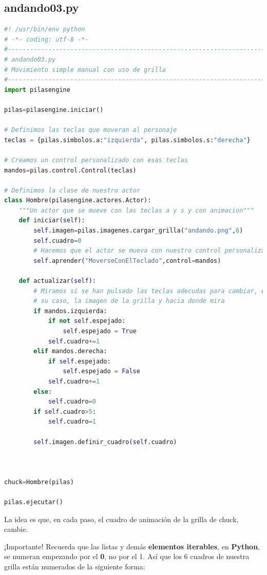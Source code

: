 \documentclass{article}
\begin{document}
\subsection{andando03.py}
\begin{lstlisting}[language=Python]
#! /usr/bin/env python
# -*- coding: utf-8 -*-
#-----------------------------------------------------------------------
# andando03.py
# Movimiento simple manual con uso de grilla
#-----------------------------------------------------------------------
import pilasengine

pilas=pilasengine.iniciar()

# Definimos las teclas que moveran al personaje
teclas = {pilas.simbolos.a:"izquierda", pilas.simbolos.s:"derecha"}

# Creamos un control personalizado con esas teclas
mandos=pilas.control.Control(teclas)

# Definimos la clase de nuestro actor
class Hombre(pilasengine.actores.Actor):
    """Un actor que se mueve con las teclas a y s y con animacion"""
    def iniciar(self):
        self.imagen=pilas.imagenes.cargar_grilla("andando.png",6)
        self.cuadro=0
        # Hacemos que el actor se mueva con nuestro control personalizado
        self.aprender("MoverseConElTeclado",control=mandos)
    
    def actualizar(self):
        # Miramos si se han pulsado las teclas adecudas para cambiar, en
        # su caso, la imagen de la grilla y hacia donde mira
        if mandos.izquierda:
            if not self.espejado:
                self.espejado = True
            self.cuadro+=1
        elif mandos.derecha:
            if self.espejado:
                self.espejado = False
            self.cuadro+=1
        else:
            self.cuadro=0
        if self.cuadro>5:
            self.cuadro=1
            
        self.imagen.definir_cuadro(self.cuadro)
                
            
        
chuck=Hombre(pilas)

pilas.ejecutar()

\end{lstlisting}
\vspace{\baselineskip}

La idea es que, en cada paso, el cuadro de animación de la grilla de chuck, cambie.\par
¡Importante! Recuerda que las listas y demás \textbf{elementos iterables}, en \textbf{Python}, se numeran empezando por el \textbf{0}, no por el 1. Así que los 6 cuadros de nuestra grilla están numerados de la siguiente forma:\par
\end{document}
